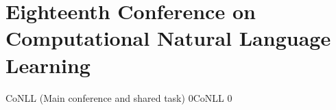 \chapter[CoNLL: Thursday--Friday, June 26--27]{Eighteenth Conference on Computational Natural Language Learning}
\thispagestyle{emptyheader}



\clearpage
\begin{wsschedule}
{CoNLL (Main conference and shared task)}
{0}{CoNLL}
{0}
{\CoNLLLoc}



\end{wsschedule}
